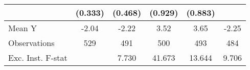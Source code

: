 {\begin{tabular}{l*{5}{c}}
            &     (0.333)         &     (0.468)         &     (0.929)         &     (0.883)         &                     \\
\midrule
Mean Y      &       -2.04         &       -2.22         &        3.52         &        3.65         &       -2.25         \\
Observations&         529         &         491         &         500         &         493         &         484         \\
Exc. Inst. F-stat&                     &       7.730         &      41.673         &      13.644         &       9.706         \\
\bottomrule
\end{tabular}
}
